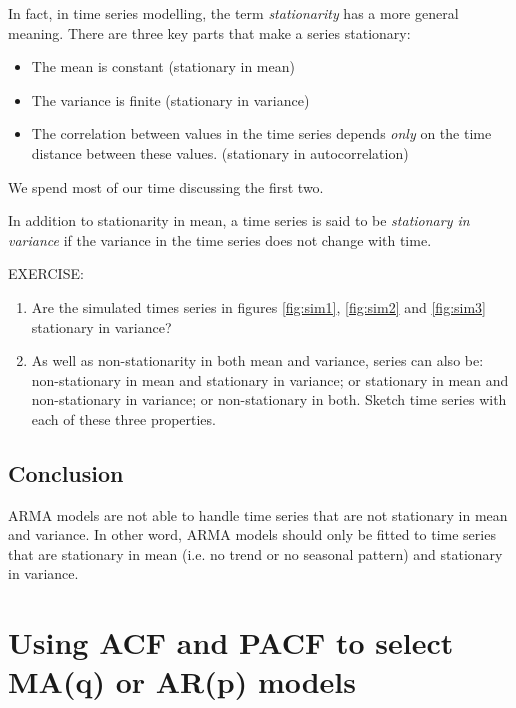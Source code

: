 \documentclass[a4paper,11pt,oneside,onecolumn]{book}
\begin{document}
\vspace{.2cm}

In fact, in time series modelling, the term \emph{stationarity} has a more general meaning. There are three key parts that make a series stationary:
\begin{itemize}
\item The mean is constant (stationary in mean)
\item The variance is finite (stationary in variance)
\item The correlation between values in the time series depends \emph{only} on
the time distance between these values. (stationary in autocorrelation)
\end{itemize}
We spend most of our time discussing the first two.



\begin{definition}
 In addition to stationarity
in mean, a time series is said to be {\it stationary in variance} if
the variance in the time series does not change with time. 
\end{definition}

\noindent EXERCISE: 
\begin{enumerate}
\item Are the simulated times series in figures \ref{fig:sim1}, \ref{fig:sim2} and \ref{fig:sim3}  stationary in variance?

\item As well as non-stationarity in both mean and
variance, series can also be: non-stationary in mean and stationary
in variance; or stationary in mean and non-stationary in variance;
or non-stationary in both. Sketch time series with each of
these three properties. 

\end{enumerate}


\section{Conclusion}

ARMA models are not able to handle time series that are not stationary in mean and variance.
In other word, ARMA models should only be fitted to time series that are stationary in mean (i.e. no trend or no seasonal pattern)
and stationary in variance.
 



\chapter{ Using ACF and PACF to select  MA(q) or AR(p) models}
\label{chp:ACF:PACF:AR:MA}
 
\end{document}
